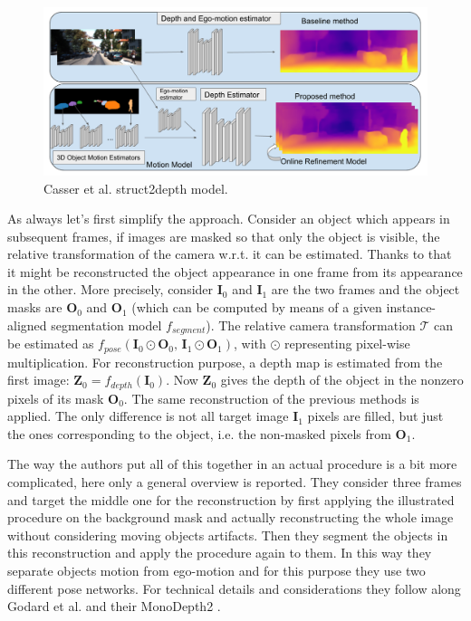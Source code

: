 \begin{figure}
	\centering
	\includegraphics[scale=0.3]{figs/struct2depth}
	\caption{Casser et al. struct2depth \cite{struct2depth} model. \label{fig:struct2depth}}
\end{figure}

As always let's first simplify the approach.
Consider an object which appears in subsequent frames, if images are masked so that only the object is visible, the relative transformation of the camera w.r.t. it can be estimated.
Thanks to that it might be reconstructed the object appearance in one frame from its appearance in the other.
More precisely, consider $\mathbf{I}_{0}$ and $\mathbf{I}_{1}$ are the two frames and the object masks are $\mathbf{O}_{0}$ and $\mathbf{O}_{1}$ (which can be computed by means of a given instance-aligned segmentation model $f_{segment}$).
The relative camera transformation $\mathcal{T}$ can be estimated as $f_{pose}(\mathbf{I}_{0} \odot \mathbf{O}_{0}, \, \mathbf{I}_{1} \odot \mathbf{O}_{1})$, with $\odot$ representing pixel-wise multiplication.
For reconstruction purpose, a depth map is estimated from the first image: $\mathbf{Z}_{0} = f_{depth}(\mathbf{I}_{0})$.
Now $\mathbf{Z}_{0}$ gives the depth of the object in the nonzero pixels of its mask $\mathbf{O}_{0}$.
The same reconstruction of the previous methods is applied.
The only difference is not all target image $\mathbf{I}_{1}$ pixels are filled, but just the ones corresponding to the object, i.e. the non-masked pixels from $\mathbf{O}_{1}$.

The way the authors put all of this together in an actual procedure is a bit more complicated, here only a general overview is reported.
They consider three frames and target the middle one for the reconstruction by first applying the illustrated procedure on the background mask and actually reconstructing the whole image without considering moving objects artifacts.
Then they segment the objects in this reconstruction and apply the procedure again to them.
In this way they separate objects motion from ego-motion and for this purpose they use two different pose networks.
For technical details and considerations they follow along Godard et al. and their MonoDepth2 \cite{MonoDepth2}.

